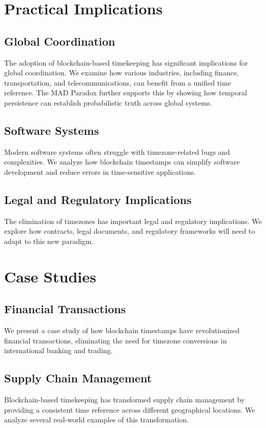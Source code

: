 \documentclass[12pt]{report}
\begin{document}
\chapter{Practical Implications}

\section{Global Coordination}
The adoption of blockchain-based timekeeping has significant implications for global coordination. We examine how various industries, including finance, transportation, and telecommunications, can benefit from a unified time reference. The MAD Paradox \cite{Houk2024} further supports this by showing how temporal persistence can establish probabilistic truth across global systems.

\section{Software Systems}
Modern software systems often struggle with timezone-related bugs and complexities. We analyze how blockchain timestamps can simplify software development and reduce errors in time-sensitive applications.

\section{Legal and Regulatory Implications}
The elimination of timezones has important legal and regulatory implications. We explore how contracts, legal documents, and regulatory frameworks will need to adapt to this new paradigm.

\chapter{Case Studies}

\section{Financial Transactions}
We present a case study of how blockchain timestamps have revolutionized financial transactions, eliminating the need for timezone conversions in international banking and trading.

\section{Supply Chain Management}
Blockchain-based timekeeping has transformed supply chain management by providing a consistent time reference across different geographical locations. We analyze several real-world examples of this transformation.
\end{document}
